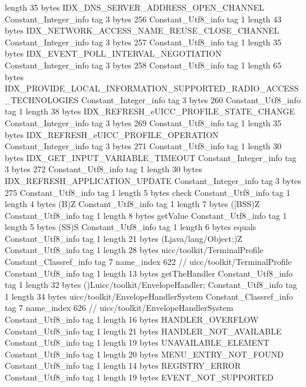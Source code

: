 {{{			length	35
			bytes	IDX_DNS_SERVER_ADDRESS_OPEN_CHANNEL
		}
		Constant_Integer_info {
			tag	3
			bytes	256
		}
		Constant_Utf8_info {
			tag	1
			length	43
			bytes	IDX_NETWORK_ACCESS_NAME_REUSE_CLOSE_CHANNEL
		}
		Constant_Integer_info {
			tag	3
			bytes	257
		}
		Constant_Utf8_info {
			tag	1
			length	35
			bytes	IDX_EVENT_POLL_INTERVAL_NEGOTIATION
		}
		Constant_Integer_info {
			tag	3
			bytes	258
		}
		Constant_Utf8_info {
			tag	1
			length	65
			bytes	IDX_PROVIDE_LOCAL_INFORMATION_SUPPORTED_RADIO_ACCESS_TECHNOLOGIES
		}
		Constant_Integer_info {
			tag	3
			bytes	260
		}
		Constant_Utf8_info {
			tag	1
			length	38
			bytes	IDX_REFRESH_eUICC_PROFILE_STATE_CHANGE
		}
		Constant_Integer_info {
			tag	3
			bytes	269
		}
		Constant_Utf8_info {
			tag	1
			length	35
			bytes	IDX_REFRESH_eUICC_PROFILE_OPERATION
		}
		Constant_Integer_info {
			tag	3
			bytes	271
		}
		Constant_Utf8_info {
			tag	1
			length	30
			bytes	IDX_GET_INPUT_VARIABLE_TIMEOUT
		}
		Constant_Integer_info {
			tag	3
			bytes	272
		}
		Constant_Utf8_info {
			tag	1
			length	30
			bytes	IDX_REFRESH_APPLICATION_UPDATE
		}
		Constant_Integer_info {
			tag	3
			bytes	275
		}
		Constant_Utf8_info {
			tag	1
			length	5
			bytes	check
		}
		Constant_Utf8_info {
			tag	1
			length	4
			bytes	(B)Z
		}
		Constant_Utf8_info {
			tag	1
			length	7
			bytes	([BSS)Z
		}
		Constant_Utf8_info {
			tag	1
			length	8
			bytes	getValue
		}
		Constant_Utf8_info {
			tag	1
			length	5
			bytes	(SS)S
		}
		Constant_Utf8_info {
			tag	1
			length	6
			bytes	equals
		}
		Constant_Utf8_info {
			tag	1
			length	21
			bytes	(Ljava/lang/Object;)Z
		}
		Constant_Utf8_info {
			tag	1
			length	28
			bytes	uicc/toolkit/TerminalProfile
		}
		Constant_Classref_info {
			tag	7
			name_index	622		// uicc/toolkit/TerminalProfile
		}
		Constant_Utf8_info {
			tag	1
			length	13
			bytes	getTheHandler
		}
		Constant_Utf8_info {
			tag	1
			length	32
			bytes	()Luicc/toolkit/EnvelopeHandler;
		}
		Constant_Utf8_info {
			tag	1
			length	34
			bytes	uicc/toolkit/EnvelopeHandlerSystem
		}
		Constant_Classref_info {
			tag	7
			name_index	626		// uicc/toolkit/EnvelopeHandlerSystem
		}
		Constant_Utf8_info {
			tag	1
			length	16
			bytes	HANDLER_OVERFLOW
		}
		Constant_Utf8_info {
			tag	1
			length	21
			bytes	HANDLER_NOT_AVAILABLE
		}
		Constant_Utf8_info {
			tag	1
			length	19
			bytes	UNAVAILABLE_ELEMENT
		}
		Constant_Utf8_info {
			tag	1
			length	20
			bytes	MENU_ENTRY_NOT_FOUND
		}
		Constant_Utf8_info {
			tag	1
			length	14
			bytes	REGISTRY_ERROR
		}
		Constant_Utf8_info {
			tag	1
			length	19
			bytes	EVENT_NOT_SUPPORTED
}}}
